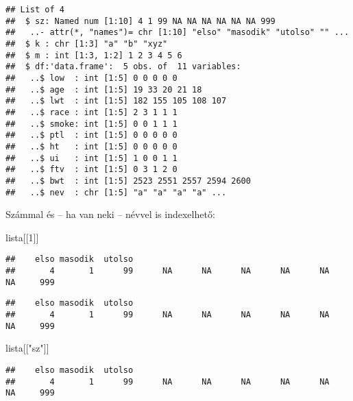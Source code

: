 \documentclass[
]{book}
\newenvironment{Shaded}{\begin{snugshade}}{\end{snugshade}}
\newcommand{\DecValTok}[1]{\textcolor[rgb]{0.00,0.00,0.81}{#1}}
\newcommand{\NormalTok}[1]{#1}
\newcommand{\OperatorTok}[1]{\textcolor[rgb]{0.81,0.36,0.00}{\textbf{#1}}}
\newcommand{\StringTok}[1]{\textcolor[rgb]{0.31,0.60,0.02}{#1}}
\begin{document}
\begin{verbatim}
## List of 4
##  $ sz: Named num [1:10] 4 1 99 NA NA NA NA NA NA 999
##   ..- attr(*, "names")= chr [1:10] "elso" "masodik" "utolso" "" ...
##  $ k : chr [1:3] "a" "b" "xyz"
##  $ m : int [1:3, 1:2] 1 2 3 4 5 6
##  $ df:'data.frame':  5 obs. of  11 variables:
##   ..$ low  : int [1:5] 0 0 0 0 0
##   ..$ age  : int [1:5] 19 33 20 21 18
##   ..$ lwt  : int [1:5] 182 155 105 108 107
##   ..$ race : int [1:5] 2 3 1 1 1
##   ..$ smoke: int [1:5] 0 0 1 1 1
##   ..$ ptl  : int [1:5] 0 0 0 0 0
##   ..$ ht   : int [1:5] 0 0 0 0 0
##   ..$ ui   : int [1:5] 1 0 0 1 1
##   ..$ ftv  : int [1:5] 0 3 1 2 0
##   ..$ bwt  : int [1:5] 2523 2551 2557 2594 2600
##   ..$ nev  : chr [1:5] "a" "a" "a" "a" ...
\end{verbatim}

Számmal és -- ha van neki -- névvel is indexelhető:

\begin{Shaded}
\begin{Highlighting}[]
\NormalTok{lista[[}\DecValTok{1}\NormalTok{]]}
\end{Highlighting}
\end{Shaded}

\begin{verbatim}
##    elso masodik  utolso                                                         
##       4       1      99      NA      NA      NA      NA      NA      NA     999
\end{verbatim}

\begin{Shaded}
\end{Shaded}

\begin{verbatim}
##    elso masodik  utolso                                                         
##       4       1      99      NA      NA      NA      NA      NA      NA     999
\end{verbatim}

\begin{Shaded}
\begin{Highlighting}[]
\NormalTok{lista[[}\StringTok{"sz"}\NormalTok{]]}
\end{Highlighting}
\end{Shaded}

\begin{verbatim}
##    elso masodik  utolso                                                         
##       4       1      99      NA      NA      NA      NA      NA      NA     999
\end{verbatim}
\end{document}
